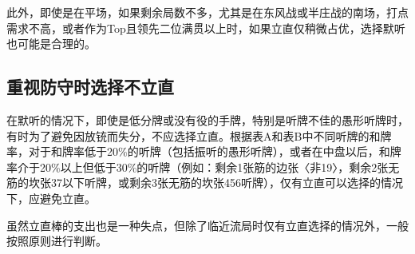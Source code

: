 此外，即使是在平场，如果剩余局数不多，尤其是在东风战或半庄战的南场，打点需求不高，或者作为Top且领先二位满贯以上时，如果立直仅稍微占优，选择默听也可能是合理的。

\subsection{重视防守时选择不立直}
在默听的情况下，即使是低分牌或没有役的手牌，特别是听牌不佳的愚形听牌时，有时为了避免因放铳而失分，不应选择立直。根据表A和表B中不同听牌的和牌率，对于和牌率低于20\%的听牌（包括振听的愚形听牌），或者在中盘以后，和牌率介于20\%以上但低于30\%的听牌（例如：剩余1张筋的边张〈非19〉，剩余2张无筋的坎张37以下听牌，或剩余3张无筋的坎张456听牌），仅有立直可以选择的情况下，应避免立直。

虽然立直棒的支出也是一种失点，但除了临近流局时仅有立直选择的情况外，一般按照原则进行判断。

